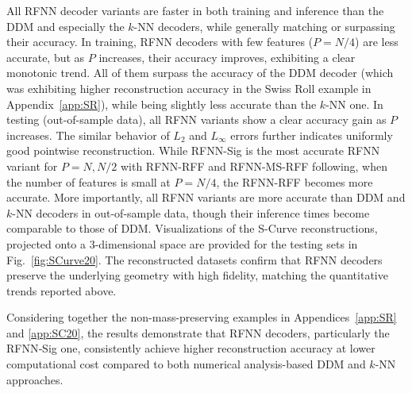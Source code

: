 \documentclass{article}
\begin{document}
All RFNN decoder variants are faster in both training and inference than the DDM and especially the $k$-NN decoders, while generally matching or surpassing their accuracy. In training, RFNN decoders with few features ($P=N/4$) are less accurate, but as $P$ increases, their accuracy improves, exhibiting a clear monotonic trend. All of them surpass the accuracy of the DDM decoder (which was exhibiting higher reconstruction accuracy in the Swiss Roll example in Appendix~\ref{app:SR}), while being slightly less accurate than the $k$-NN one. In testing (out-of-sample data), all RFNN variants show a clear accuracy gain as $P$ increases. The similar behavior of $L_2$ and $L_\infty$ errors further indicates uniformly good pointwise reconstruction. While RFNN-Sig is the most accurate RFNN variant for $P=N,N/2$ with RFNN-RFF and RFNN-MS-RFF following, when the number of features is small at $P=N/4$, the RFNN-RFF becomes more accurate. More importantly, all RFNN variants are more accurate than DDM and $k$-NN decoders in out-of-sample data, though their inference times become comparable to those of DDM. Visualizations of the S-Curve reconstructions, projected onto a $3$-dimensional space are provided for the testing sets in Fig.~\ref{fig:SCurve20}. The reconstructed datasets confirm that RFNN decoders preserve the underlying geometry with high fidelity, matching the quantitative trends reported above.

Considering together the non-mass-preserving examples in Appendices~\ref{app:SR} and \ref{app:SC20}, the results demonstrate that RFNN decoders, particularly the RFNN‑Sig one, consistently achieve higher reconstruction accuracy at lower computational cost compared to both numerical analysis-based DDM and $k$-NN approaches.
\end{document}
